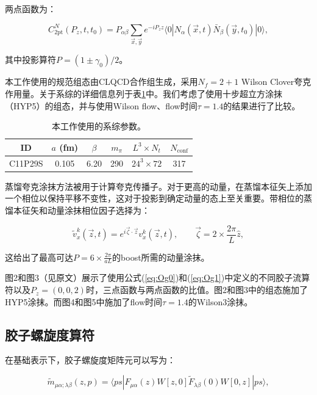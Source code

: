 \documentclass[12pt,a4paper]{ctexart}
\theoremstyle{definition}
\begin{document}
两点函数为：

\begin{equation}
C^N_{\text{2pt}}(P_z, t, t_0) = P_{\alpha\beta} \sum_{\vec{x},\vec{y}} e^{-iP_z z} \langle 0| N_\alpha(\vec{x}, t) \bar{N}_\beta(\vec{y}, t_0) |0\rangle,
\label{eq:2pt_projection}
\end{equation}

其中投影算符$P = (1 \pm \gamma_0)/2$。

本工作使用的规范组态由CLQCD合作组生成，采用$N_f = 2+1$ Wilson Clover夸克作用量。关于系综的详细信息列于表\ref{tab:ensembles}中。我们考虑了使用十步超立方涂抹（HYP5）的组态，并与使用Wilson flow、flow时间$\tau = 1.4$的结果进行了比较。

\begin{table}[H]
\centering
\caption{本工作使用的系综参数。}
\label{tab:ensembles}
\begin{tabular}{cccccc}
\toprule
ID & $a$ (fm) & $\beta$ & $m_\pi$ & $L^3 \times N_t$ & $N_{\text{conf}}$ \\
\midrule
C11P29S & 0.105 & 6.20 & 290 & $24^3 \times 72$ & 317 \\
\bottomrule
\end{tabular}
\end{table}

蒸馏夸克涂抹方法被用于计算夸克传播子。对于更高的动量，在蒸馏本征矢上添加一个相位以保持平移不变性，这对于投影到确定动量的态上至关重要\cite{Egerer2021}。带相位的蒸馏本征矢和动量涂抹相位因子选择为：

\begin{equation}
\tilde{v}^k_x(\vec{z}, t) = e^{i\vec{\zeta}\cdot\vec{z}} v^k_x(\vec{z}, t), \qquad \vec{\zeta} = 2 \times \frac{2\pi}{L} \hat{z},
\label{eq:phased_distillation}
\end{equation}

这给出了最高可达$P = 6 \times \frac{2\pi}{aL}$的boost所需的动量涂抹。

图2和图3（见原文）展示了使用公式(\ref{eq:Og0})和(\ref{eq:Og1})中定义的不同胶子流算符以及$P_z = (0,0,2)$时，三点函数与两点函数的比值。图2和图3中的组态施加了HYP5涂抹。而图4和图5中施加了flow时间$\tau = 1.4$的Wilson3涂抹。

\subsection{胶子螺旋度算符}

在基础表示下，胶子螺旋度矩阵元可以写为：

\begin{equation}
\tilde{m}_{\mu\alpha;\lambda\beta}(z,p) = \langle ps| F_{\mu\alpha}(z) W[z,0] \tilde{F}_{\lambda\beta}(0) W[0,z] |ps\rangle,
\label{eq:helicity_matrix}
\end{equation}
\end{document}
